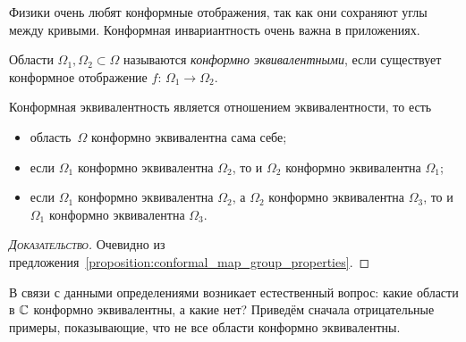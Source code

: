 \documentclass[../complex-analysis.tex]{subfiles}
\begin{document}
Физики очень любят конформные отображения, так как они сохраняют углы между кривыми. Конформная инвариантность очень важна в приложениях.

\begin{df}
 Области $ \Omega_1, \Omega_2 \subset \Omega $ называются \textit{конформно эквивалентными}, если существует конформное отображение $ f \colon\, \Omega_1 \to \Omega_2 $.
\end{df}
\begin{prop}
 Конформная эквивалентность является отношением эквивалентности, то есть
 \begin{itemize}
  \item область~$ \Omega $ конформно эквивалентна сама себе;
  \item если $ \Omega_1 $ конформно эквивалентна $ \Omega_2 $, то и $ \Omega_2 $ конформно эквивалентна $ \Omega_1 $;
  \item если $ \Omega_1 $ конформно эквивалентна $ \Omega_2 $, а $ \Omega_2 $ конформно эквивалентна $ \Omega_3 $, то и $ \Omega_1 $ конформно эквивалентна $ \Omega_3 $.
 \end{itemize}
\end{prop}
\begin{proof}[\normalfont\textsc{Доказательство}]
 Очевидно из предложения~\ref{proposition:conformal_map_group_properties}.
\end{proof}

В связи с данными определениями возникает естественный вопрос: какие области в $ \mathbb{C} $ конформно эквивалентны, а какие нет? Приведём сначала отрицательные примеры, показывающие, что не все области конформно эквивалентны.
\end{document}
